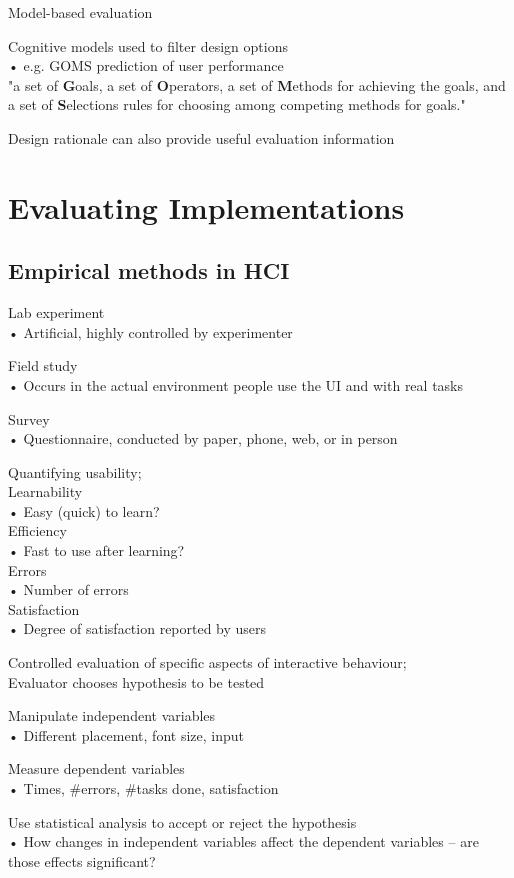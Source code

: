 \documentclass[]{project_plan}
\begin{document}
Model-based evaluation

Cognitive models used to filter design options\\
• e.g. GOMS prediction of user performance\\
"a set of \textbf{G}oals, a set of \textbf{O}perators, a set of \textbf{M}ethods for achieving the goals, and a set of \textbf{S}elections rules for choosing among competing methods for goals."


Design rationale can also provide useful
evaluation information

\section{Evaluating Implementations}

\subsection{Empirical methods in HCI}
Lab experiment\\
• Artificial, highly controlled by experimenter

Field study\\
• Occurs in the actual environment people use the UI and with real tasks

Survey\\
• Questionnaire, conducted by paper, phone, web, or in person

Quantifying usability;\\
Learnability\\
• Easy (quick) to learn?\\
Efficiency\\
• Fast to use after learning?\\
Errors\\
• Number of errors\\
Satisfaction\\
• Degree of satisfaction reported by users

Controlled evaluation of specific aspects of interactive behaviour;\\
Evaluator chooses hypothesis to be tested

Manipulate independent variables\\
• Different placement, font size, input

Measure dependent variables\\
• Times, \#errors, \#tasks done, satisfaction

Use statistical analysis to accept or reject the hypothesis\\
• How changes in independent variables affect the
dependent variables – are those effects significant?
\end{document}
